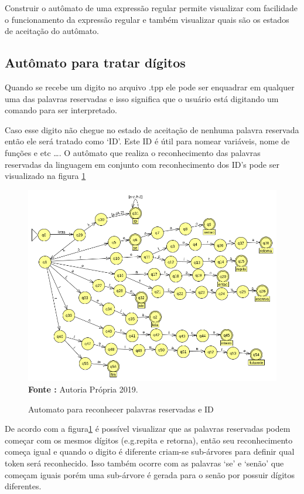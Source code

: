 \documentclass[12pt]{article}
\begin{document}
Construir o autômato de uma expressão regular permite visualizar com facilidade o funcionamento da expressão regular e também visualizar quais são os estados de aceitação do autômato. 

\subsection{Autômato para tratar dígitos} 
Quando se recebe um digito no arquivo .tpp ele pode ser enquadrar em qualquer uma das palavras reservadas e isso significa que o usuário está digitando um comando para ser interpretado.  

Caso esse digito não chegue no estado de aceitação de nenhuma palavra reservada então ele será tratado como `ID'. Este ID é útil para nomear variáveis, nome de funções e etc \ldots. 
O autômato que realiza o reconhecimento das palavras reservadas da linguagem em conjunto com reconhecimento dos ID's pode ser visualizado na figura \ref{fig:11}
\begin{figure}[H]  
	\centering
	\caption{Automato para reconhecer palavras reservadas e ID}
	\includegraphics[scale=0.48]{automato.png} \\ 
	\textbf{Fonte :} Autoria Própria 2019.
	\label{fig:11}
\end{figure}   

De acordo com a figura\ref{fig:11} é possível visualizar que as palavras reservadas podem começar com os mesmos dígitos (e.g.repita e retorna), então seu reconhecimento começa igual e quando o digito é diferente criam-se sub-árvores para definir qual token será reconhecido. Isso também ocorre com as palavras `se' e `senão' que começam iguais porém uma sub-árvore é gerada para o senão por possuir dígitos diferentes.
\end{document}
